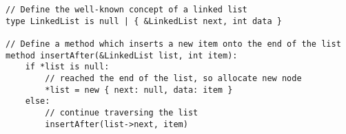 \begin{lstlisting}
// Define the well-known concept of a linked list
type LinkedList is null | { &LinkedList next, int data }

// Define a method which inserts a new item onto the end of the list
method insertAfter(&LinkedList list, int item):
    if *list is null:
        // reached the end of the list, so allocate new node
        *list = new { next: null, data: item }
    else:
        // continue traversing the list
        insertAfter(list->next, item)
\end{lstlisting}




